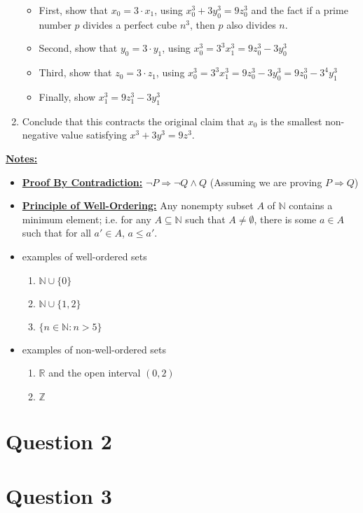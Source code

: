\documentclass[12pt]{article}
\begin{document}
\begin{mdframed}
\begin{enumerate}[1.]
        \begin{itemize}
            \item First, show that $x_0 = 3 \cdot x_1$, using $x_0^3 + 3y_0^3 = 9z_0^3$ and the
            fact if a prime number $p$ divides a perfect cube $n^3$, then $p$ also divides $n$.
            \item Second, show that $y_0 = 3 \cdot y_1$, using $x_0^3 = 3^3 x_1^3 = 9z_0^3 - 3y_0^3$
            \item Third, show that $z_0 = 3 \cdot z_1$, using $x_0^3 = 3^3 x_1^3 = 9z_0^3 - 3y_0^3 =  9z_0^3 - 3^4y_1^3$
            \item Finally, show $x_1^3 = 9z_1^3 - 3y_1^3$
        \end{itemize}

        \item Conclude that this contracts the original claim that $x_0$ is the smallest
        non-negative value satisfying $x^3 + 3y^3 = 9z^3$.
    \end{enumerate}

\end{mdframed}

\bigskip

\underline{\textbf{Notes:}}

\begin{itemize}
    \item \underline{\textbf{Proof By Contradiction:}} $\neg P \Rightarrow \neg Q \land Q$ (Assuming
    we are proving $P \Rightarrow Q$)
    \item \underline{\textbf{Principle of Well-Ordering:}} Any nonempty subset $A$
    of $\mathbb{N}$ contains a minimum element; i.e. for any $A \subseteq \mathbb{N}$
    such that $A \neq \emptyset$, there is some $a \in A$ such that for all $a' \in A$, $a \leq a'$.

    \item examples of well-ordered sets
    \begin{enumerate}[1.]
        \item $\mathbb{N} \cup \{0\}$
        \item $\mathbb{N} \cup \{1,2\}$
        \item $\{n \in \mathbb{N}: n > 5\}$
    \end{enumerate}
    \item examples of non-well-ordered sets
    \begin{enumerate}[1.]
        \item $\mathbb{R}$ and the open interval $(0,2)$
        \item $\mathbb{Z}$
    \end{enumerate}
\end{itemize}

\section*{Question 2}

\section*{Question 3}
\end{document}

